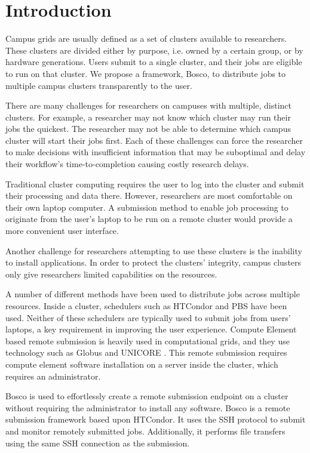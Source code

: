 \label{chapter:campusjobs} 
\section{Introduction}

Campus grids are usually defined as a set of clusters available to researchers.  These clusters are divided either by purpose, i.e. owned by a certain group, or by hardware generations.  Users submit to a single cluster, and their jobs are eligible to run on that cluster.  We propose a framework, Bosco, to distribute jobs to multiple campus clusters transparently to the user. 

There are many challenges for researchers on campuses with multiple, distinct clusters.  For example, a researcher may not know which cluster may run their jobs the quickest.  The researcher may not be able to determine which campus cluster will start their jobs first.  Each of these challenges can force the researcher to make decisions with insufficient information that may be suboptimal and delay their workflow's time-to-completion causing costly research delays.

Traditional cluster computing requires the user to log into the cluster and submit their processing and data there. However, researchers are most comfortable on their own laptop computer.  A submission method to enable job processing to originate from the user's laptop to be run on a remote cluster would provide a more convenient user interface.

Another challenge for researchers attempting to use these clusters is the inability to install applications.  In order to protect the clusters' integrity, campus clusters only give researchers limited capabilities on the resources.

A number of different methods have been used to distribute jobs across multiple resources.  Inside a cluster, schedulers such as HTCondor  \cite{litzkow1988condor} and PBS \cite{henderson1995job} have been used.  Neither of these schedulers are typically used to submit jobs from users' laptops, a key requirement in improving the user experience.  Compute Element based remote submission is heavily used in computational grids, and they use technology such as Globus \cite{foster2001globus} and UNICORE \cite{romberg2002unicore}. This remote submission requires compute element software installation on a server inside the cluster, which requires an administrator.

Bosco \cite{weitzel2014accessing} is used to effortlessly create a remote submission endpoint on a cluster without requiring the administrator to install any software.  Bosco is a remote submission framework based upon HTCondor.  It uses the SSH \cite{ylonen2006secure} protocol to submit and monitor remotely submitted jobs.  Additionally, it performs file transfers using the same SSH connection as the submission.


